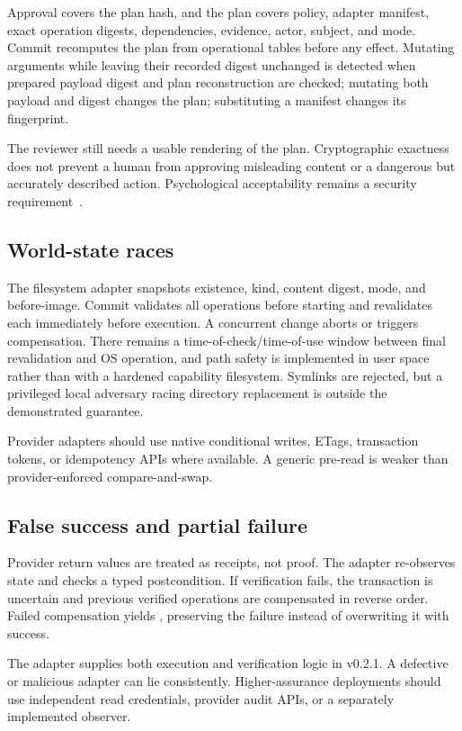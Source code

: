 Approval covers the plan hash, and the plan covers policy, adapter manifest, exact operation digests, dependencies, evidence, actor, subject, and mode. Commit recomputes the plan from operational tables before any effect. Mutating arguments while leaving their recorded digest unchanged is detected when prepared payload digest and plan reconstruction are checked; mutating both payload and digest changes the plan; substituting a manifest changes its fingerprint.

The reviewer still needs a usable rendering of the plan. Cryptographic exactness does not prevent a human from approving misleading content or a dangerous but accurately described action. Psychological acceptability remains a security requirement~\cite{saltzer1975protection}.

\subsection{World-state races}

The filesystem adapter snapshots existence, kind, content digest, mode, and before-image. Commit validates all operations before starting and revalidates each immediately before execution. A concurrent change aborts or triggers compensation. There remains a time-of-check/time-of-use window between final revalidation and OS operation, and path safety is implemented in user space rather than with a hardened capability filesystem. Symlinks are rejected, but a privileged local adversary racing directory replacement is outside the demonstrated guarantee.

Provider adapters should use native conditional writes, ETags, transaction tokens, or idempotency APIs where available. A generic pre-read is weaker than provider-enforced compare-and-swap.

\subsection{False success and partial failure}

Provider return values are treated as receipts, not proof. The adapter re-observes state and checks a typed postcondition. If verification fails, the transaction is uncertain and previous verified operations are compensated in reverse order. Failed compensation yields , preserving the failure instead of overwriting it with success.

The adapter supplies both execution and verification logic in v0.2.1. A defective or malicious adapter can lie consistently. Higher-assurance deployments should use independent read credentials, provider audit APIs, or a separately implemented observer.

